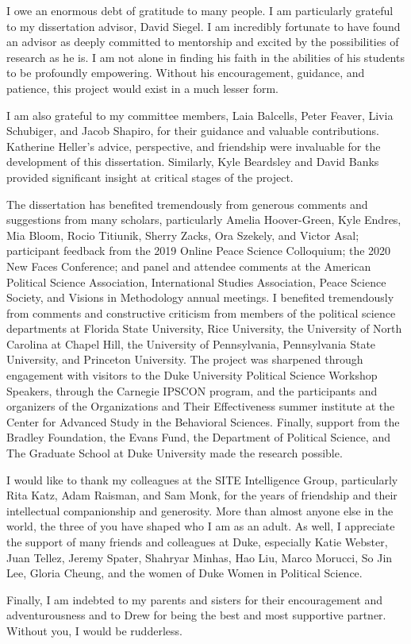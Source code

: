 I owe an enormous debt of gratitude to many people. I am particularly grateful to my dissertation advisor, David Siegel. I am incredibly fortunate to have found an advisor as deeply committed to mentorship and excited by the possibilities of research as he is.  I am not alone in finding his faith in the abilities of his students to be profoundly empowering.  Without his encouragement, guidance, and patience, this project would exist in a much lesser form. 

I am also grateful to my committee members, Laia Balcells, Peter Feaver, Livia Schubiger, and Jacob Shapiro, for their guidance and valuable contributions.  Katherine Heller's advice, perspective, and friendship were invaluable for the development of this dissertation. Similarly, Kyle Beardsley and David Banks provided significant insight at critical stages of the project.

The dissertation has benefited tremendously from generous comments and suggestions from many scholars, particularly Amelia Hoover-Green, Kyle Endres, Mia Bloom,  Rocio Titiunik,  Sherry Zacks, Ora Szekely, and Victor Asal; participant feedback from the 2019 Online Peace Science Colloquium; the 2020 New Faces Conference; and panel and attendee comments at the American Political Science Association, International Studies Association, Peace Science Society, and Visions in Methodology annual meetings. I benefited tremendously from comments and constructive criticism from members of the political science departments at Florida State University, Rice University, the University of North Carolina at Chapel Hill, the University of Pennsylvania, Pennsylvania State University, and Princeton University. The project was sharpened through engagement with visitors to the Duke University Political Science Workshop Speakers, through the Carnegie IPSCON program, and the participants and organizers of the Organizations and Their Effectiveness summer institute at the Center for Advanced Study in the Behavioral Sciences.  Finally, support from the Bradley Foundation, the Evans Fund, the Department of Political Science, and The Graduate School at Duke University made the research possible.

I would like to thank my colleagues at the SITE Intelligence Group, particularly Rita Katz, Adam Raisman, and Sam Monk, for the years of friendship and their intellectual companionship and generosity. More than almost anyone else in the world, the three of you have shaped who I am as an adult. As well, I appreciate the support of many friends and colleagues at Duke, especially Katie Webster, Juan Tellez, Jeremy Spater, Shahryar Minhas,  Hao Liu, Marco Morucci, So Jin Lee, Gloria Cheung, and the women of Duke Women in Political Science.

Finally, I am indebted to my parents and sisters for their encouragement and adventurousness and to Drew for being the best and most supportive partner. Without you, I would be rudderless.


